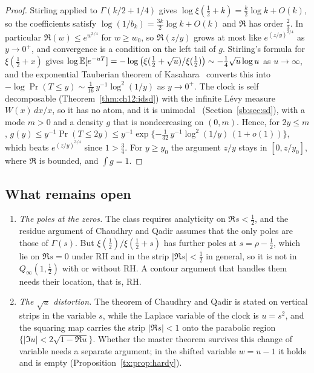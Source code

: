 \begin{proof}
Stirling applied to $\Gamma(k/2+1/4)$ gives $\log\xi(\tfrac12+k) = \tfrac{k}{2}\log k + O(k)$, so the coefficients satisfy $\log(1/b_k) = \tfrac{3k}{2}\log k + O(k)$ and $\mathfrak R$ has order $\tfrac23$. In particular $\mathfrak R(w)\le e^{w^{3/4}}$ for $w\ge w_0$, so $\mathfrak R(z/y)$ grows at most like $e^{(z/y)^{3/4}}$ as $y\to0^+$, and convergence is a condition on the left tail of $g$. Stirling's formula for $\xi(\tfrac12+x)$ gives $\log\mathbb{E}[e^{-uT}]=-\log\big(\xi(\tfrac12+\sqrt u)/\xi(\tfrac12)\big)\sim-\tfrac14\sqrt u\log u$ as $u\to\infty$, and the exponential Tauberian theorem of Kasahara~\cite{Kasahara78} converts this into $-\log\Pr(T\le y)\sim\tfrac1{16}\,y^{-1}\log^2(1/y)$ as $y\to0^+$. The clock is self decomposable (Theorem~\ref{thm:ch12:idsd}) with the infinite L\'evy measure $W(x)\,dx/x$, so it has no atom, and it is unimodal~\cite{Yamazato78} (Section~\ref{sb:sec:sd}), with a mode $m>0$ and a density $g$ that is nondecreasing on $(0,m)$. Hence, for $2y\le m$, $g(y)\le y^{-1}\Pr(T\le2y)\le y^{-1}\exp\{-\tfrac1{32}\,y^{-1}\log^2(1/y)\,(1+o(1))\}$, which beats $e^{(z/y)^{3/4}}$ since $1>\tfrac34$. For $y\ge y_0$ the argument $z/y$ stays in $[0,z/y_0]$, where $\mathfrak R$ is bounded, and $\int g=1$.
\end{proof}

\subsection{What remains open}\label{gl:sec:rmt-open}

\begin{enumerate}
\item[(i)] \emph{The poles at the zeros.} The class requires analyticity on $\Re s<\tfrac12$, and the residue argument of Chaudhry and Qadir assumes that the only poles are those of $\Gamma(s)$. But $\xi(\tfrac12)/\xi(\tfrac12+s)$ has further poles at $s=\rho-\tfrac12$, which lie on $\Re s=0$ under RH and in the strip $|\Re s|<\tfrac12$ in general, so it is not in $Q_\infty(1,\tfrac12)$ with or without RH. A contour argument that handles them needs their location, that is, RH.
\item[(ii)] \emph{The $\sqrt u$ distortion.} The theorem of Chaudhry and Qadir is stated on vertical strips in the variable $s$, while the Laplace variable of the clock is $u=s^2$, and the squaring map carries the strip $|\Re s|<1$ onto the parabolic region $\{|\Im u|<2\sqrt{1-\Re u}\}$. Whether the master theorem survives this change of variable needs a separate argument; in the shifted variable $w=u-1$ it holds and is empty (Proposition~\ref{tx:prop:hardy}).
\end{enumerate}


